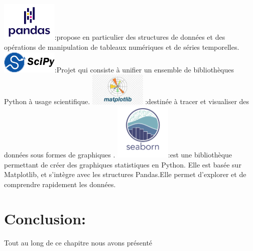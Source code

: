 \newline
\includegraphics[width=0.20\textwidth]{figures/chap3/pandas.png}:propose en particulier des structures de données et des opérations de manipulation de tableaux numériques et de séries temporelles.
\newline
\includegraphics[width=0.20\textwidth]{figures/chap3/scipy.png}:Projet qui consiste à unifier un ensemble de bibliothèques Python à usage scientifique.
\newline
\includegraphics[width=0.20\textwidth]{figures/chap3/matplotlib.jpg} :destinée à tracer et visualiser des données sous formes de graphiques .
\newline
\includegraphics[width=0.20\textwidth]{figures/chap3/seaborn.png}:est une bibliothèque permettant de créer des graphiques statistiques en Python. Elle est basée sur Matplotlib, et s'intègre avec les structures Pandas.Elle permet d'explorer et de comprendre rapidement les données.\\
\section{Conclusion:}

 Tout au long de ce chapitre nous avons présenté 
